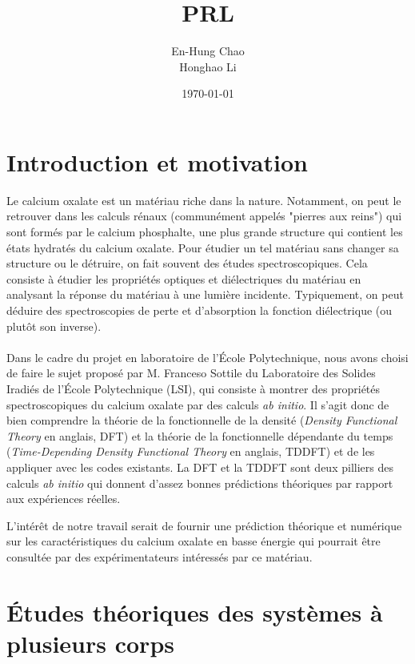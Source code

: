 \documentclass[12pt, french]{report}
\title{PRL}
\author{En-Hung Chao \\ Honghao Li}
\date{\today}
\theoremstyle{theoreme}
\begin{document}
\maketitle

\newpage
\tableofcontents

\newpage
\chapter{Introduction et motivation}
Le calcium oxalate est un matériau riche dans la nature. Notamment, on peut le retrouver dans les calculs rénaux (communément appelés "pierres aux reins") qui sont formés par le calcium phosphalte, une plus grande structure qui contient les états hydratés du calcium oxalate. 
Pour étudier un tel matériau sans changer sa structure ou le détruire, on fait souvent des études spectroscopiques.
Cela consiste à étudier les propriétés optiques et diélectriques du matériau en analysant la réponse du matériau à une lumière incidente.
Typiquement, on peut déduire des spectroscopies de perte et d'absorption la fonction diélectrique (ou plutôt son inverse).
\\\\Dans le cadre du projet en laboratoire de l'École Polytechnique, nous avons choisi de faire le sujet proposé par M. Franceso Sottile du Laboratoire des Solides Iradiés de l'École Polytechnique (LSI), qui consiste à montrer des propriétés spectroscopiques du calcium oxalate par des calculs \textit{ab initio}. 
Il s'agit donc de bien comprendre la théorie de la fonctionnelle de la densité (\textit{Density Functional Theory} en anglais, DFT) et la théorie de la fonctionnelle dépendante du temps (\textit{Time-Depending Density Functional Theory} en anglais, TDDFT) et de les appliquer avec les codes existants.
La DFT et la TDDFT sont deux pilliers des calculs \textit{ab initio} qui donnent d'assez bonnes prédictions théoriques par rapport aux expériences réelles.

L'intérêt de notre travail serait de fournir une prédiction théorique et numérique sur les caractéristiques du calcium oxalate en basse énergie qui pourrait être consultée par des expérimentateurs intéressés par ce matériau. 
 

\chapter{Études théoriques des systèmes à plusieurs corps}
\end{document}
